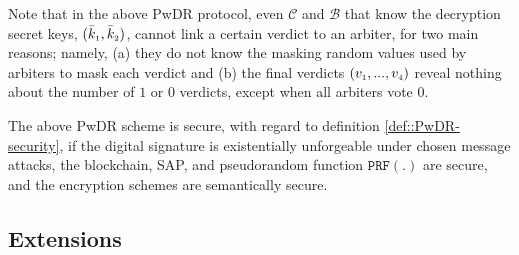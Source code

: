 %






Note that in the above PwDR protocol, even $\mathcal{C}$ and $\mathcal{B}$ that know the decryption secret keys, $(\bar k_{\scriptscriptstyle 1}, \bar k_{\scriptscriptstyle 2})$, cannot link a certain verdict to an arbiter, for two main reasons; namely,  (a) they do not know the masking random values used by arbiters to mask each verdict and (b) the final verdicts $(v_{\scriptscriptstyle 1},..., v_{\scriptscriptstyle 4})$ reveal nothing about the number of $1$ or $0$ verdicts, except when all arbiters vote $0$.  



\begin{theorem}\label{theorem::PwDR-security}
The above PwDR scheme is secure, with regard to definition \ref{def::PwDR-security}, if the digital signature is existentially unforgeable under chosen message attacks,  the blockchain, SAP, and pseudorandom function $\mathtt{PRF}(.)$ are secure, and the encryption schemes are semantically secure. 
\end{theorem}




\subsection{Extensions}

